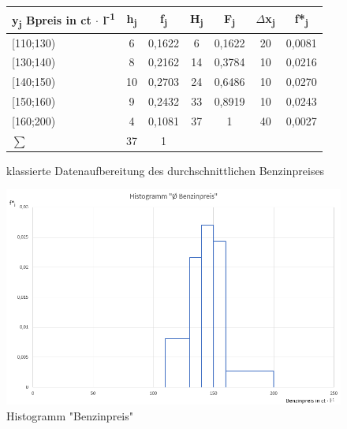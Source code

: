 \begin{figure}[ht]
  \centering

\begin{tabular}{l|cccccc}
\textbf{y\textsubscript{j} Bpreis in ct $\cdot$ l\textsuperscript{-1}}        & \textbf{h\textsubscript{j}} & \textbf{f\textsubscript{j}}                  & \textbf{H\textsubscript{j}} & \textbf{F\textsubscript{j}} & \textbf{$\Delta$x\textsubscript{j}} & \textbf{f*\textsubscript{j}} \\ \hline
{[}110;130)            & 6          & 0,1622                      & 6          & 0,1622     & 20               & 0,0081      \\
{[}130;140)            & 8          & 0,2162                      & 14         & 0,3784     & 10               & 0,0216      \\
{[}140;150)            & 10         & 0,2703                      & 24         & 0,6486     & 10               & 0,0270      \\
{[}150;160)            & 9          & 0,2432                      & 33         & 0,8919     & 10               & 0,0243      \\
{[}160;200)            & 4          & 0,1081                      & 37         & 1          & 40               & 0,0027      \\ \hline
$\sum$                      & 37         & 1                           &            &            &                  &
\end{tabular}
\caption{klassierte Datenaufbereitung des durchschnittlichen Benzinpreises}
\label{tab:klassDatenBenz}
\end{figure}


\begin{figure}[H]
  \centering
  \includegraphics[width = \textwidth]{graphics/histogramm_benz_uni.png}
  \caption{Histogramm "Benzinpreis"}
  \label{fig:histBenzUni}
\end{figure}

